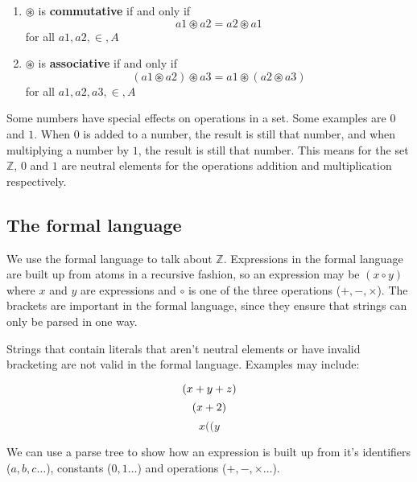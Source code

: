 \begin{enumerate}
  \item 
    $\circledast$ is {\bf commutative} if and only if
    \begin{dmath}
	a1 \circledast a2 = a2 \circledast a1
    \end{dmath} 
    for all $a1,a2,\in,A$
  \item 
    $\circledast$ is {\bf associative} if and only if
    \begin{dmath}
	(a1 \circledast a2) \circledast a3 = a1 \circledast (a2 \circledast a3)
    \end{dmath} 
    for all $a1,a2,a3,\in,A$
\end{enumerate}

Some numbers have special effects on operations in a set. Some examples are $0$
and $1$. When $0$ is added to a number, the result is still that number, and
when multiplying a number by $1$, the result is still that number. This means
for the set $\mathbb{Z}$, $0$ and $1$ are neutral elements for the operations
addition and multiplication respectively.

\subsection{The formal language}

We use the formal language to talk about $\mathbb{Z}$. Expressions in the formal
language are built up from atoms in a recursive fashion, so an expression may be
$(x \circ y)$ where $x$ and $y$ are expressions and $\circ$ is one of the three
operations ($+, -, \times$). The brackets are important in the formal language,
since they ensure that strings can only be parsed in one way.

Strings that contain literals that aren't neutral elements or have invalid
bracketing are not valid in the formal language. Examples may include:

\begin{dmath}
	(x + y + z)\\
\end{dmath}
\begin{dmath}
	(x + 2)\\
\end{dmath}
\begin{dmath}
	x((y
\end{dmath}

We can use a parse tree to show how an expression is built up from it's
identifiers ($a, b, c\ldots$), constants ($0, 1\ldots$) and operations ($+, -,
\times\ldots$).


